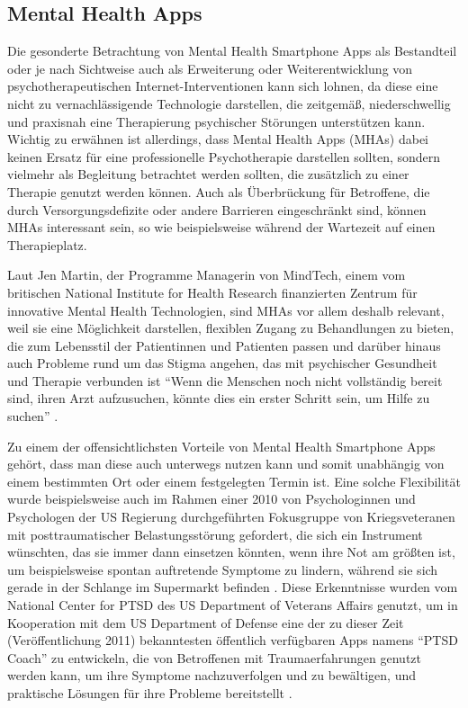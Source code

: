 \subsection{Mental Health Apps}\label{subsubsec:mental_health_apps}


Die gesonderte Betrachtung von Mental Health Smartphone Apps als Bestandteil 
oder je nach Sichtweise auch als Erweiterung oder Weiterentwicklung von psychotherapeutischen 
Internet-Interventionen kann sich lohnen, da diese eine nicht zu vernachlässigende Technologie darstellen, 
die zeitgemäß, niederschwellig und praxisnah eine Therapierung psychischer Störungen unterstützen kann. 
Wichtig zu erwähnen ist allerdings, dass Mental Health Apps (MHAs) dabei keinen Ersatz für eine professionelle 
Psychotherapie darstellen sollten, sondern vielmehr als Begleitung betrachtet werden sollten, 
die zusätzlich zu einer Therapie genutzt werden können. Auch als Überbrückung für Betroffene, 
die durch Versorgungsdefizite oder andere Barrieren eingeschränkt sind, können MHAs interessant sein, 
so wie beispielsweise während der Wartezeit auf einen Therapieplatz.

Laut Jen Martin, der Programme Managerin von MindTech, einem vom britischen 
National Institute for Health Research finanzierten Zentrum für innovative Mental Health Technologien, 
sind MHAs vor allem deshalb relevant, weil sie eine Möglichkeit darstellen, flexiblen Zugang zu Behandlungen zu bieten, 
die zum Lebensstil der Patientinnen und Patienten passen und darüber hinaus auch Probleme rund um das Stigma angehen, 
das mit psychischer Gesundheit und Therapie verbunden ist \cite[S.21]{anthes_e_mental_2016} %
“Wenn die Menschen noch nicht vollständig bereit sind, ihren Arzt aufzusuchen, könnte dies ein erster Schritt sein, 
um Hilfe zu suchen” \cite[S.21]{anthes_e_mental_2016}. %

Zu einem der offensichtlichsten Vorteile von Mental Health Smartphone Apps gehört, 
dass man diese auch unterwegs nutzen kann und somit unabhängig von einem bestimmten Ort 
oder einem festgelegten Termin ist. Eine solche Flexibilität wurde beispielsweise auch im Rahmen einer 2010 
von Psychologinnen und Psychologen der US Regierung durchgeführten Fokusgruppe von Kriegsveteranen 
mit posttraumatischer Belastungsstörung gefordert, die sich ein Instrument wünschten, 
das sie immer dann einsetzen könnten, wenn ihre Not am größten ist, um beispielsweise spontan auftretende 
Symptome zu lindern, während sie sich gerade in der Schlange im Supermarkt befinden 
\cite[S.21]{anthes_e_mental_2016}. %
Diese Erkenntnisse wurden vom National Center for PTSD des US Department of Veterans Affairs genutzt, 
um in Kooperation mit dem US Department of Defense eine der zu dieser Zeit (Veröffentlichung 2011) 
bekanntesten öffentlich verfügbaren Apps namens “PTSD Coach” zu entwickeln, 
die von Betroffenen mit Traumaerfahrungen genutzt werden kann, um ihre Symptome nachzuverfolgen und zu bewältigen, 
und praktische Lösungen für ihre Probleme bereitstellt \cite[S.21]{anthes_e_mental_2016}. %

